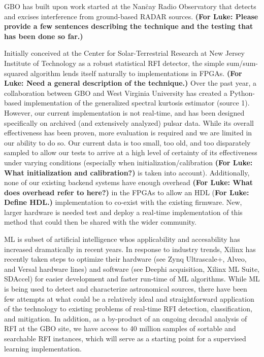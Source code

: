 \documentclass[10pt]{myNSF}
\begin{document}
\begin{itemize}

 GBO has built upon work started
at the Nan\"{c}ay Radio Observatory that detects and excises
interference from ground-based RADAR sources.  \textbf{(For Luke:
  Please provide a few sentences describing the technique and the
  testing that has been done so far.)}  

 Initially conceived at the Center for
Solar-Terrestrial Research at New Jersey Institute of Technology as a
robust statistical RFI detector, the simple sum/sum-squared algorithm
lends itself naturally to implementations in FPGAs. \textbf{(For Luke:
  Need a general description of the technique.)} Over the past year, a
collaboration between GBO and West Virginia University has created a
Python-based implementation of the generalized spectral kurtosis
estimator (source 1). However, our current implementation is not
real-time, and has been designed specifically on archived (and
extensively analyzed) pulsar data.  While its overall effectiveness
has been proven, more evaluation is required and we are limited in our
ability to do so.  Our current data is too small, too old, and too
disparately sampled to allow our tests to arrive at a high level of
certainty of its effectiveness under varying conditions (especially
when initialization/calibration \textbf{(For Luke: What initialization
  and calibration?)} is taken into account). Additionally, none of our
existing backend systems have enough overhead \textbf{(For Luke: What
  does overhead refer to here?)} in the FPGAs to allow an HDL
(\textbf{For Luke: Define HDL.)}  implementation to co-exist with the
existing firmware.  New, larger hardware is needed test and deploy a
real-time implementation of this method that could then be shared with
the wider community.

 ML is subset of artificial intelligence
whos applicability and accesability has increased dramatically in
recent years. In response to industry trends, Xilinx has recently
taken steps to optimize their hardware (see Zynq Ultrascale+, Alveo,
and Versal hardware lines) and software (see Deephi acquisition,
Xilinx ML Suite, SDAccel) for easier development and faster run-time
of ML algorithms.  While ML is being used to detect and characterize
astronomical sources, there have been few attempts at what could be a
relatively ideal and straightforward application of the technology to
existing problems of real-time RFI detection, classification, and
mitigation.  In addition, as a by-product of an ongoing decadal
analysis of RFI at the GBO site, we have access to 40 million samples
of sortable and searchable RFI instances, which will serve as a
starting point for a supervised learning implementation.


\end{itemize}
\end{document}

